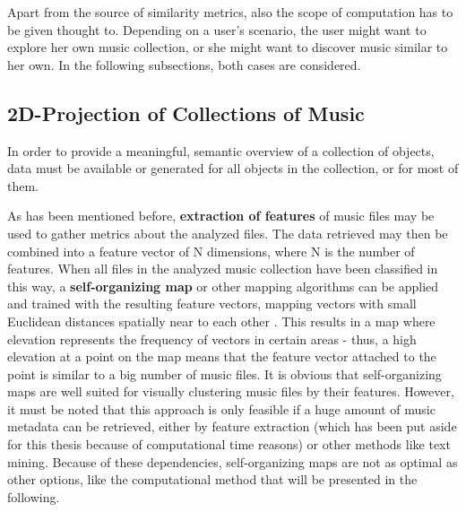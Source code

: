 Apart from the source of similarity metrics, also the scope of computation has to be given thought to.
Depending on a user's scenario, the user might want to explore her own music collection, or she might want
to discover music similar to her own. In the following subsections, both cases are considered.

\subsection{2D-Projection of Collections of Music}
\label{subsec:2dprojection}

In order to provide a meaningful, semantic overview of a collection of objects, data must be available 
or generated for all objects in the collection, or for most of them. 

As has been mentioned before, \textbf{extraction of features} of music files may be used to gather metrics
about the analyzed files. The data retrieved may then be combined into a feature vector of N dimensions,
where N is the number of features. When all files in the analyzed music collection have been classified in
this way, a \textbf{self-organizing map} or other mapping algorithms can be applied and trained with the resulting feature vectors, mapping 
vectors with small Euclidean distances spatially near to each other \cite{RAU_02ismir}. This results
in a map where elevation represents the frequency of vectors in certain areas - thus, a high elevation
at a point on the map means that the feature vector attached to the point is similar to a big number of music
files. It is obvious that self-organizing maps are well suited for visually clustering music files by their 
features. However, it must be noted that this approach is only feasible if a huge amount of music metadata 
can be retrieved, either by feature extraction (which has been put aside for this thesis because of computational time reasons) or other methods like text mining. Because of these dependencies, self-organizing 
maps are not as optimal as other options, like the computational method that will be presented in the following.


